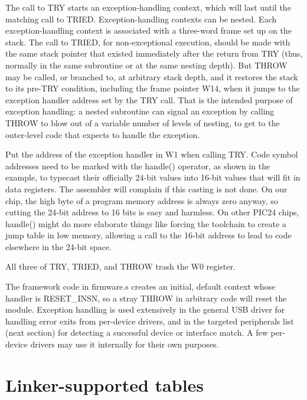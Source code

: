 The call to TRY starts an exception-handling context, which
will last until the matching call to TRIED.  Exception-handling contexts can
be nested.  Each exception-handling context is associated with a three-word
frame set up on the stack.  The call to TRIED, for non-exceptional
execution, should be made with the same stack pointer that existed
immediately after the return from TRY (thus, normally in the same subroutine
or at the same nesting depth).  But THROW may be called, or branched to, at
arbitrary stack depth, and it restores the stack to its pre-TRY condition,
including the frame pointer W14, when it jumps to the exception handler
address set by the TRY call.  That is the intended purpose of exception
handling: a nested subroutine can signal an exception by calling THROW to
blow out of a variable number of levels of nesting, to get to the
outer-level code that expects to handle the exception.

Put the address of the exception handler in W1 when calling TRY.  Code
symbol addresses need to be marked with the handle() operator, as shown in
the example, to typecast their officially 24-bit values into 16-bit values
that will fit in data registers.  The assembler will complain if this
casting is not done.  On our chip, the high byte of a program memory address
is always zero anyway, so cutting the 24-bit address to 16 bits is easy and
harmless.  On other PIC24 chips, handle() might do more elaborate things
like forcing the toolchain to create a jump table in low memory, allowing a
call to the 16-bit address to lead to code elsewhere in the 24-bit space.

All three of TRY, TRIED, and THROW trash the W0 register.

The framework code in firmware.s creates an initial, default context whose
handler is RESET\_INSN, so a stray THROW in arbitrary code will reset the
module.  Exception handling is used extensively in the general USB driver
for handling error exits from per-device drivers, and in the targeted
peripherals list (next section) for detecting a successful device or
interface match.  A few per-device drivers may use it internally for their
own purposes.

\section{Linker-supported tables}

